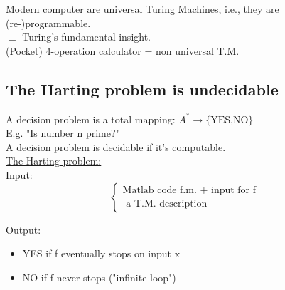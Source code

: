 \documentclass[12pt,a4paper]{report}
\theoremstyle{break}
\newenvironment{proof}[1][Proof]{\begin{trivlist}
\item[\hskip \labelsep {\bfseries #1}]}{\end{trivlist}}
\begin{document}
\begin{proof}
\begin{itemize}
\begin{center}
\end{center}
\end{itemize}
\end{proof}
Modern computer are universal Turing Machines, i.e., they are (re-)programmable.\\
$\equiv$ Turing's fundamental insight.\\
(Pocket) 4-operation calculator = non universal T.M.
\subsection*{The Harting problem is undecidable}
A decision problem is a total mapping: $A^*\rightarrow \{\text{YES,NO}\}$\\
E.g. "Is number n prime?"\\
A decision problem is decidable if it's computable.\\
\underline{The Harting problem:}\\

Input:\begin{equation}
  \left\{
    \begin{split}
    \text{Matlab code f.m. + input for f}\\ 
    \text{ a T.M. description}
    \end{split}
  \right.
\end{equation}

Output:
\begin{itemize}
\item YES if f eventually stops on input x
\item NO if f never stops ("infinite loop")
\end{itemize}
\end{document}
